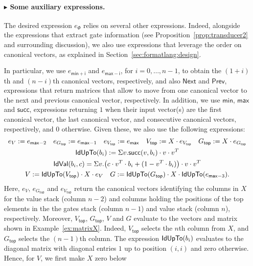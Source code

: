 \paragraph{$\blacktriangleright$ Some auxiliary expressions.} 
The desired \langfor expression $e_\Phi$ relies on several other expressions. Indeed, alongside
the expressions that extract gate information (see Proposition~\ref{prop:transducer2} and surrounding discussion), we also use \langfor expressions that leverage the order on canonical vectors, as explained in Section~\ref{sec:formatlang:design}. 

In particular, we use  $e_{\mathsf{min}+\mathsf{i}}$ and  $e_{\mathsf{max}-\mathsf{i}}$, for $i=0,\ldots,n-1$,
to obtain the $(1+i)$th and $(n-i)$th canonical vectors, respectively, and also $\mathsf{Next}$ and $\mathsf{Prev}$, expressions that return matrices that allow to
move from one canonical vector to the next and previous canonical vector, respectively. In addition, we use $\mathsf{min}$, $\mathsf{max}$ and $\mathsf{succ}$,  expressions returning
$1$ when their input vector(s) are the first canonical vector, the last canonical vector, and consecutive canonical vectors, respectively, and $0$ otherwise. Given these, we also use the following expressions:
\begin{gather*}\allowdisplaybreaks
   e_{V}:=e_{\mathsf{max}-2} \quad e_{G_{\mathsf{top}}}:=e_{\mathsf{max}-1} \quad     e_{V_{\mathsf{top}}}:=e_{\mathsf{max}} \quad 
  V_{\mathsf{top}}:= X\cdot e_{V_{\mathsf{top}}} \quad  G_{\mathsf{top}} :=X\cdot e_{G_{\mathsf{top}}}\\
   \Iden{b_i}:=\ssum v. \mathsf{succ}(v,b_i)\cdot v\cdot v^T  \\
\pondIden{b_i}{c}=\ssum v. \bigl(c\cdot v^T\cdot b_i + (1- v^T\cdot b_i)\bigr)\cdot v\cdot v^T \\
           V:= \Iden{V_{\mathsf{top}}} \cdot X \cdot e_V \quad
        G := \Iden{G_{\mathsf{top}}}\cdot X \cdot \Iden{e_{\mathsf{max}-3}}.
 \end{gather*}
Here, $e_V$, $e_{G_{\mathsf{top}}}$ and $e_{V_{\mathsf{top}}}$ return the canonical vectors identifying the columns in $X$ for the value stack (column $n-2$) and columns holding the positions of the top elements in the the gates stack (column $n-1$) and value stack (column $n$), respectively. Moreover, 
 $V_{\mathsf{top}}$, $G_{\mathsf{top}}$, $V$ and $G$ evaluate to
the vectors and matrix shown in Example~\ref{ex:matrixX}. Indeed,  $V_{\mathsf{top}}$
selects the $n$th column from $X$, and  $G_{\mathsf{top}}$ selects the $(n-1)$th column. The expression $\mathsf{IdUpTo}(b_i)$ evaluates to the diagonal matrix with diagonal entries $1$ up to position $(i,i)$ and zero otherwise. Hence, for $V$, we first make $X$ zero below
